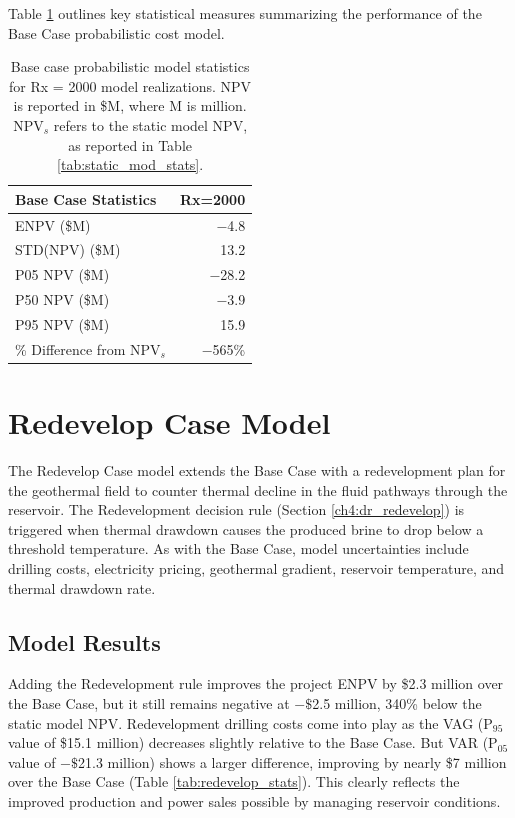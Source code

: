 Table \ref{tab:base_stats} outlines key statistical measures summarizing the performance of the Base Case probabilistic cost model.
\begin{table}[H]
\centering
\begin{tabular}{|l|r|}
\hline
\textbf{Base Case Statistics} & Rx=2000 \\ \hline
ENPV (\$M) & $\boldsymbol{-}$4.8 \\ \hline
STD(NPV) (\$M) & 13.2 \\ \hline
P05 NPV (\$M) & $\boldsymbol{-}$28.2 \\ \hline
P50 NPV (\$M) & $\boldsymbol{-}$3.9 \\ \hline
P95 NPV (\$M) & 15.9 \\ \hline
\% Difference from NPV$_{s}$ & $\boldsymbol{-}$565\% \\ \hline
\end{tabular}
\caption[Probabilistic Base Case statistics]{Base case probabilistic model statistics for Rx = 2000 model realizations. NPV is reported in \$M, where M is million. NPV$_s$ refers to the static model NPV, as reported in Table \ref{tab:static_mod_stats}.}
\label{tab:base_stats}
\end{table}
\vfill
\pagebreak
\section{Redevelop Case Model}
\label{ch6:redevelop_case}

The Redevelop Case model extends the Base Case with a redevelopment plan for the geothermal field to counter thermal decline in the fluid pathways through the reservoir. The Redevelopment decision rule (Section \ref{ch4:dr_redevelop}) is triggered when thermal drawdown causes the produced brine to drop below a threshold temperature. As with the Base Case, model uncertainties include drilling costs, electricity pricing, geothermal gradient, reservoir temperature, and thermal drawdown rate.

\subsection{Model Results}\label{ch6:redevelop_results}

Adding the Redevelopment rule improves the project ENPV by \$2.3 million over the Base Case, but it still remains negative at $-\$$2.5 million, 340\% below the static model NPV. Redevelopment drilling costs come into play as the VAG (P$_{95}$ value of \$15.1 million) decreases slightly relative to the Base Case. But VAR (P$_{05}$ value of $-\$$21.3 million) shows a larger difference, improving by nearly \$7 million over the Base Case (Table \ref{tab:redevelop_stats}). This clearly reflects the improved production and power sales possible by managing reservoir conditions.

